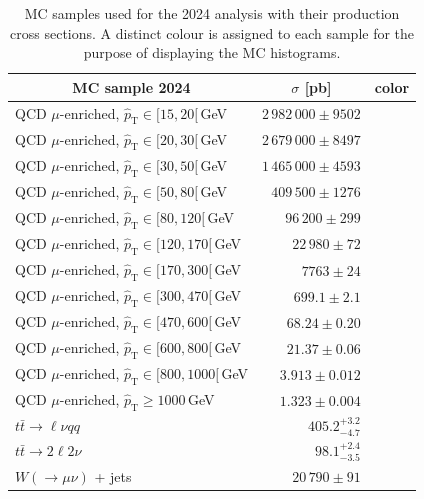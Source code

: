 \clearpage

\begin{table}[h!]
\centering
\small
\renewcommand{\arraystretch}{1.4}
\begin{tabular}{lrc}
\toprule
\multicolumn{1}{c}{MC sample 2024} & \multicolumn{1}{c}{$\sigma$ [pb]} & color \\
\midrule
QCD $\mu$-enriched, $\hat{p}_{\mathrm{T}} \in [15,20[$\,GeV   & $2\,982\,000 \pm 9502$     &  \\
QCD $\mu$-enriched, $\hat{p}_{\mathrm{T}} \in [20,30[$\,GeV   & $2\,679\,000 \pm 8497$     &  \\
QCD $\mu$-enriched, $\hat{p}_{\mathrm{T}} \in [30,50[$\,GeV   & $1\,465\,000 \pm 4593$     &  \\
QCD $\mu$-enriched, $\hat{p}_{\mathrm{T}} \in [50,80[$\,GeV   & $409\,500 \pm 1276$        &  \\
QCD $\mu$-enriched, $\hat{p}_{\mathrm{T}} \in [80,120[$\,GeV  & $96\,200 \pm 299$        &  \\
QCD $\mu$-enriched, $\hat{p}_{\mathrm{T}} \in [120,170[$\,GeV & $22\,980 \pm 72$         & \colorbox{qcdcol}{\phantom{x}} \\
QCD $\mu$-enriched, $\hat{p}_{\mathrm{T}} \in [170,300[$\,GeV & $7763 \pm 24$            &  \\
QCD $\mu$-enriched, $\hat{p}_{\mathrm{T}} \in [300,470[$\,GeV & $699.1 \pm 2.1$           &  \\
QCD $\mu$-enriched, $\hat{p}_{\mathrm{T}} \in [470,600[$\,GeV & $68.24 \pm 0.20$         &  \\
QCD $\mu$-enriched, $\hat{p}_{\mathrm{T}} \in [600,800[$\,GeV & $21.37 \pm 0.06$        &  \\
QCD $\mu$-enriched, $\hat{p}_{\mathrm{T}} \in [800,1000[$\,GeV& $3.913 \pm 0.012$        &  \\
QCD $\mu$-enriched, $\hat{p}_{\mathrm{T}} \geq 1000$\,GeV     & $1.323 \pm 0.004$       &  \\
\midrule
$t\bar{t}\to \ell\nu qq$                & $405.2^{+3.2}_{-4.7}$   & \colorbox{ttsemicol}{\phantom{x}} \\
$t\bar{t}\to 2\ell2\nu$                & $98.1^{+2.4}_{-3.5}$   & \colorbox{ttcol}{\phantom{x}} \\
\midrule
$W (\to \mu\nu)$ + jets     & $20\,790 \pm 91$  & \colorbox{wcol}{\phantom{x}} \\
\bottomrule
\end{tabular}
\caption{MC samples used for the 2024 analysis with their production cross sections. A distinct colour is assigned to each sample for the purpose of displaying the MC histograms.}
\label{tab:mc_samples_2024}
\end{table}

